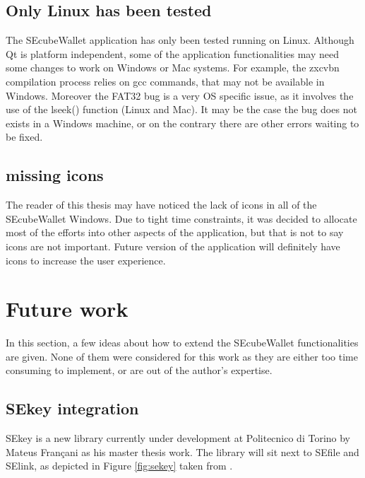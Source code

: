 \subsection{Only Linux has been tested}

The SEcubeWallet application has only been tested running on Linux. Although Qt is platform independent, some of the application functionalities may need some changes to work on Windows or Mac systems. For example, the zxcvbn compilation process relies on gcc commands, that may not be available in Windows. Moreover the FAT32 bug is a very OS specific issue, as it involves the use of the lseek() function (Linux and Mac). It may be the case the bug does not exists in a Windows machine, or on the contrary there are other errors waiting to be fixed.


\subsection{missing icons}
The reader of this thesis may have noticed the lack of icons in all of the SEcubeWallet Windows. Due to tight time constraints, it was decided to allocate most of the efforts into other aspects of the application, but that is not to say icons are not important. Future version of the application will definitely have icons to increase the user experience.


\section{Future work}
In this section, a few ideas about how to extend the SEcubeWallet functionalities are given. None of them were considered for this work as they are either too time consuming to implement, or are out of the author's expertise.


\subsection{SEkey integration}

SEkey is a new library currently under development at Politecnico di Torino by 	Mateus Françani as his master thesis work. The library will sit next to SEfile and SElink, as depicted in Figure \ref{fig:sekey} taken from \cite{sekey}.

